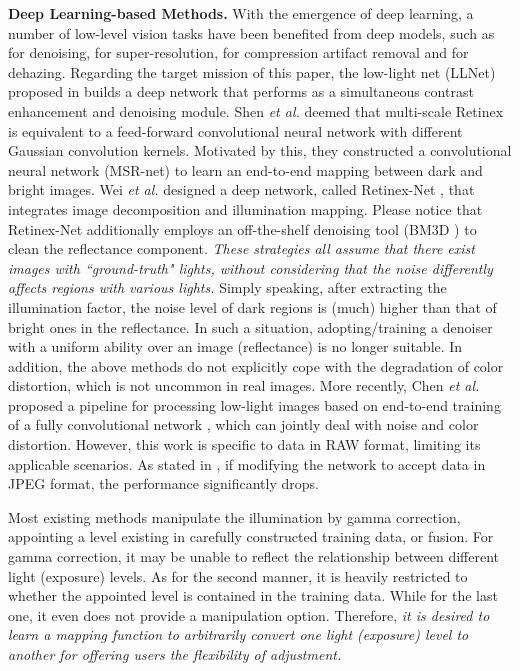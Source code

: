 \documentclass[journal,10pt,compsoc]{IEEEtran}
\begin{document}
\textbf{Deep Learning-based Methods.} With the emergence of deep learning, a number of low-level vision tasks have been benefited from deep models, such as \cite{NIPSDen,DnCNN} for denoising, \cite{PAMISR} for super-resolution, \cite{ICCVCmp} for compression artifact removal and \cite{DehNet} for dehazing. Regarding the target mission of this paper,  the low-light net (LLNet) proposed in \cite{LLNet} builds a deep network that performs as a simultaneous contrast enhancement and denoising module. Shen {\it et al.}  deemed that multi-scale Retinex is equivalent to a feed-forward convolutional neural network with different Gaussian convolution kernels. Motivated by this, they constructed a convolutional neural network (MSR-net) \cite{MSR-net} to learn an end-to-end mapping between dark and bright images. Wei {\it et al.} designed a deep network, called Retinex-Net \cite{DRD}, that integrates image decomposition and illumination mapping. Please notice that Retinex-Net additionally employs an off-the-shelf denoising tool (BM3D \cite{BM3D}) to clean the reflectance component. {\it These strategies all assume that there exist images with ``ground-truth" lights, without considering that the noise differently affects regions with various lights.} Simply speaking, after extracting the illumination factor, the noise level of dark regions is (much) higher than that of bright ones in the reflectance. In such a situation, adopting/training a denoiser with a uniform ability over an image (reflectance) is no longer suitable. In addition, the above methods do not explicitly cope with the degradation of color distortion, which is not uncommon in real images. More recently, Chen {\it et al.} proposed a pipeline for processing low-light images based on end-to-end training of a fully convolutional network \cite{SID}, which can jointly deal with noise and color distortion. However, this work is specific to data in RAW format, limiting its applicable scenarios. As stated in \cite{SID}, if modifying the network to accept data in JPEG format, the performance significantly drops.

Most existing methods manipulate the illumination by gamma correction, appointing a level existing in carefully constructed training data, or fusion. For gamma correction, it may be unable to reflect the relationship between different light (exposure) levels. As for the second manner, it is heavily restricted to whether the appointed level is contained in the training data. While for the last one, it even does not provide a manipulation option. Therefore, {\it it is desired to learn a mapping function to arbitrarily convert one light (exposure) level to another for offering users the flexibility of adjustment.}
\end{document}
